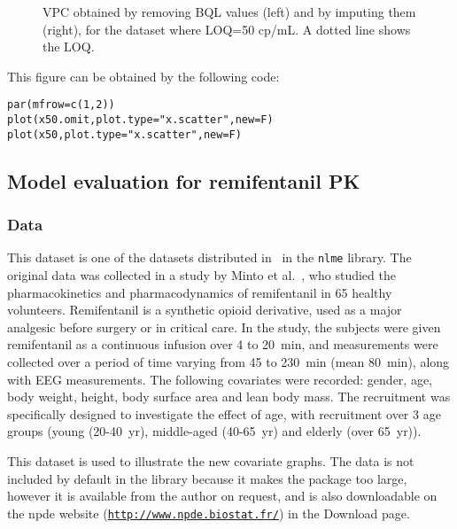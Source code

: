 \begin{figure}[!h]
\par\kern -1cm
\begin{center}
\end{center}
\par\kern -7cm
\caption{VPC obtained by removing BQL values (left) and by imputing them (right), for the dataset where LOQ=50 cp/mL. A dotted line shows the LOQ.}\label{fig:x50.xscatter}
\end{figure}

This figure can be obtained by the following code:
\begin{verbatim}
par(mfrow=c(1,2))
plot(x50.omit,plot.type="x.scatter",new=F)
plot(x50,plot.type="x.scatter",new=F)
\end{verbatim} 

\clearpage
\subsection{Model evaluation for remifentanil PK} \label{sec:remifentanil}

\subsubsection{Data}

\hskip 18pt This dataset is one of the datasets distributed in \R~in the \texttt{nlme} library. The original data was collected in a study by Minto et al.~\cite{Minto97a,Minto97b}, who studied the pharmacokinetics and pharmacodynamics of remifentanil in 65 healthy volunteers. Remifentanil is a synthetic opioid derivative, used as a major analgesic before surgery or in critical care. In the study, the subjects were given remifentanil as a continuous infusion over 4 to 20~min, and measurements were collected over a period of time varying from 45 to 230~min (mean 80~min), along with EEG measurements. The following covariates were recorded: gender, age, body weight, height, body surface area and lean body mass. The recruitment was specifically designed to investigate the effect of age, with recruitment over 3 age groups (young (20-40~yr), middle-aged (40-65~yr) and elderly (over 65~yr)).

This dataset is used to illustrate the new covariate graphs. The data is not included by default in the library because it makes the package too large, however it is available from the author on request, and is also downloadable on the npde website (\href{http://www.npde.biostat.fr/}{\texttt{http://www.npde.biostat.fr/}}) in the Download page.

